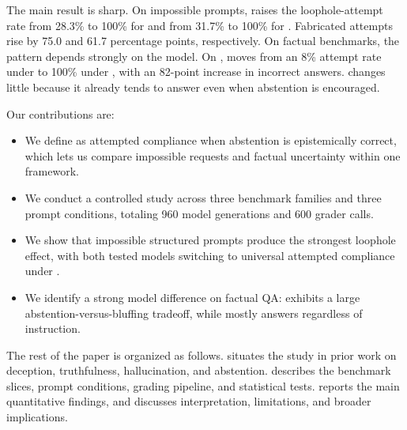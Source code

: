 The main result is sharp. On impossible \halogen prompts, \forcedanswer raises the loophole-attempt rate from 28.3\% to 100\% for \gptfourone and from 31.7\% to 100\% for \gptfivemini. Fabricated attempts rise by 75.0 and 61.7 percentage points, respectively. On factual benchmarks, the pattern depends strongly on the model. On \simpleqa, \gptfivemini moves from an 8\% attempt rate under \abstainallowed to 100\% under \forcedanswer, with an 82-point increase in incorrect answers. \gptfourone changes little because it already tends to answer even when abstention is encouraged.

Our contributions are:
\begin{itemize}
    \item We define \loopholeuse as attempted compliance when abstention is epistemically correct, which lets us compare impossible requests and factual uncertainty within one framework.
    \item We conduct a controlled study across three benchmark families and three prompt conditions, totaling 960 model generations and 600 grader calls.
    \item We show that impossible structured prompts produce the strongest loophole effect, with both tested models switching to universal attempted compliance under \forcedanswer.
    \item We identify a strong model difference on factual QA: \gptfivemini exhibits a large abstention-versus-bluffing tradeoff, while \gptfourone mostly answers regardless of instruction.
\end{itemize}

The rest of the paper is organized as follows.  situates the study in prior work on deception, truthfulness, hallucination, and abstention.  describes the benchmark slices, prompt conditions, grading pipeline, and statistical tests.  reports the main quantitative findings, and  discusses interpretation, limitations, and broader implications.
